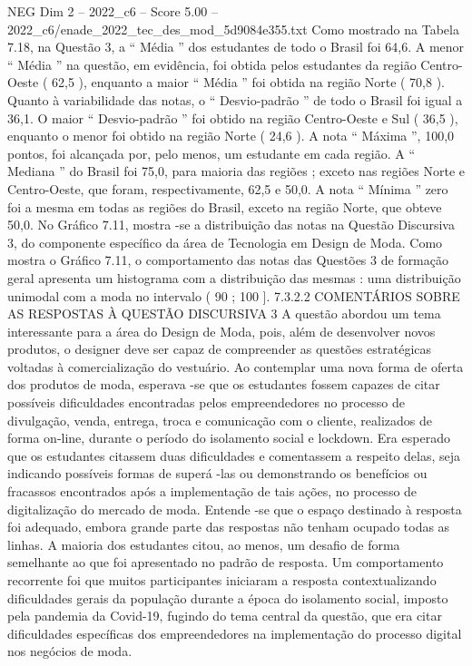 \begin{textsample}{NEG Dim 2 – 2022\_c6 – Score 5.00 – 2022\_c6/enade\_2022\_tec\_des\_mod\_5d9084e355.txt}
Como mostrado na Tabela 7.18, na Questão 3, a “ Média ” dos estudantes de todo o Brasil foi 64,6.
A menor “ Média ” na questão, em evidência, foi obtida pelos estudantes da região Centro-Oeste ( 62,5 ), enquanto a maior “ Média ” foi obtida na região Norte ( 70,8 ).
Quanto à variabilidade das notas, o “ Desvio-padrão ” de todo o Brasil foi igual a 36,1.
O maior “ Desvio-padrão ” foi obtido na região Centro-Oeste e Sul ( 36,5 ), enquanto o menor foi obtido na região Norte ( 24,6 ).
A nota “ Máxima ”, 100,0 pontos, foi alcançada por, pelo menos, um estudante em cada região.
A “ Mediana ” do Brasil foi 75,0, para maioria das regiões ; exceto nas regiões Norte e Centro-Oeste, que foram, respectivamente, 62,5 e 50,0.
A nota “ Mínima ” zero foi a mesma em todas as regiões do Brasil, exceto na região Norte, que obteve 50,0.
No Gráfico 7.11, mostra -se a distribuição das notas na Questão Discursiva 3, do componente específico da área de Tecnologia em Design de Moda.
Como mostra o Gráfico 7.11, o comportamento das notas das Questões 3 de formação geral apresenta um histograma com a distribuição das mesmas : uma distribuição unimodal com a moda no intervalo ( 90 ; 100 ]. 7.3.2.2 COMENTÁRIOS SOBRE AS RESPOSTAS À QUESTÃO DISCURSIVA 3 A questão abordou um tema interessante para a área do Design de Moda, pois, além de desenvolver novos produtos, o designer deve ser capaz de compreender as questões estratégicas voltadas à comercialização do vestuário.
Ao contemplar uma nova forma de oferta dos produtos de moda, esperava -se que os estudantes fossem capazes de citar possíveis dificuldades encontradas pelos empreendedores no processo de divulgação, venda, entrega, troca e comunicação com o cliente, realizados de forma on-line, durante o período do isolamento social e lockdown.
Era esperado que os estudantes citassem duas dificuldades e comentassem a respeito delas, seja indicando possíveis formas de superá -las ou demonstrando os benefícios ou fracassos encontrados após a implementação de tais ações, no processo de digitalização do mercado de moda.
Entende -se que o espaço destinado à resposta foi adequado, embora grande parte das respostas não tenham ocupado todas as linhas.
A maioria dos estudantes citou, ao menos, um desafio de forma semelhante ao que foi apresentado no padrão de resposta.
Um comportamento recorrente foi que muitos participantes iniciaram a resposta contextualizando dificuldades gerais da população durante a época do isolamento social, imposto pela pandemia da Covid-19, fugindo do tema central da questão, que era citar dificuldades específicas dos empreendedores na implementação do processo digital nos negócios de moda.

\end{textsample}
